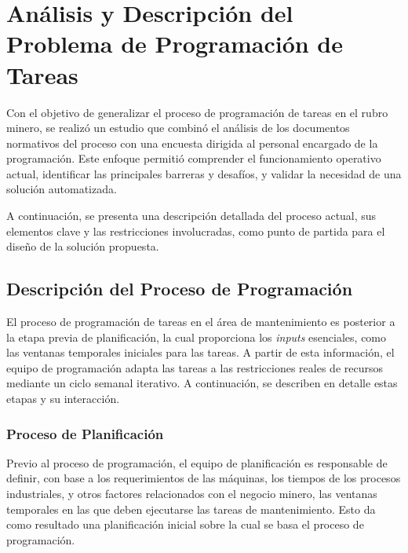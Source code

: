 \documentclass{article}
\begin{document}



\section{Análisis y Descripción del Problema de Programación de Tareas}

Con el objetivo de generalizar el proceso de programación de tareas en el rubro minero, se realizó un estudio que combinó el análisis de los documentos normativos del proceso con una encuesta dirigida al personal encargado de la programación. Este enfoque permitió comprender el funcionamiento operativo actual, identificar las principales barreras y desafíos, y validar la necesidad de una solución automatizada.

A continuación, se presenta una descripción detallada del proceso actual, sus elementos clave y las restricciones involucradas, como punto de partida para el diseño de la solución propuesta.


\subsection{Descripción del Proceso de Programación}

El proceso de programación de tareas en el área de mantenimiento es posterior a la etapa previa de planificación, la cual proporciona los \textit{inputs} esenciales, como las ventanas temporales iniciales para las tareas. A partir de esta información, el equipo de programación adapta las tareas a las restricciones reales de recursos mediante un ciclo semanal iterativo. A continuación, se describen en detalle estas etapas y su interacción.

\subsubsection{Proceso de Planificación}

Previo al proceso de programación, el equipo de planificación es responsable de definir, con base a los requerimientos de las máquinas, los tiempos de los procesos industriales, y otros factores relacionados con el negocio minero, las ventanas temporales en las que deben ejecutarse las tareas de mantenimiento. Esto da como resultado una planificación inicial sobre la cual se basa el proceso de programación.
\end{document}
